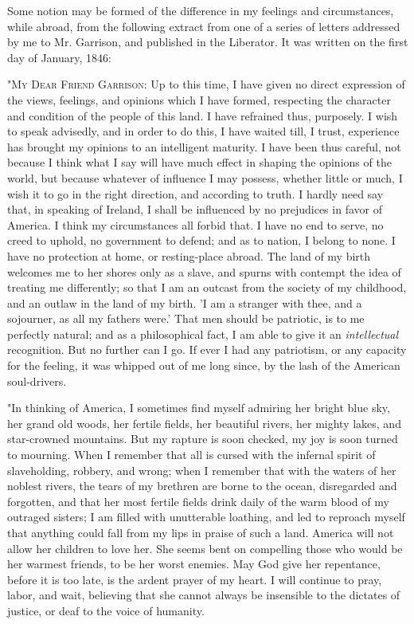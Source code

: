 Some notion may be formed of the difference in my feelings and
circumstances, while abroad, from the following extract from one of a
series of letters addressed by me to Mr. Garrison, and published in the
Liberator. It was written on the first day of January, 1846:

"\textsc{My Dear Friend Garrison}: Up to this time, I have given no
direct expression of the views, feelings, and opinions which I have
formed, respecting the character and condition of the people of this
land. I have refrained thus, purposely. I wish to speak advisedly, and
in order to do this, I have waited till, I trust, experience has brought
my opinions to an intelligent maturity. I have been thus careful, not
because I think what I say will have much effect in shaping the opinions
of the world, but because whatever of influence I may possess, whether
little or much, I wish it to go in the right direction, and according to
truth. I hardly need say that, in speaking of Ireland, I shall be
influenced by no prejudices in favor of America. I think my
circumstances all forbid that. I have no end to serve, no creed to
uphold, no government to defend; and as to nation, I belong to none. I
have no protection at home, or resting-place abroad. The land of my
birth welcomes me to her shores only as a slave, and spurns with
contempt the idea of treating me differently; so that I am an outcast
from the society of my childhood, and an outlaw in the land of my birth.
'I am a stranger with thee, and a sojourner, as all my {}fathers were.'
That men should be patriotic, is to me perfectly natural; and as a
philosophical fact, I am able to give it an \emph{intellectual}
recognition. But no further can I go. If ever I had any patriotism, or
any capacity for the feeling, it was whipped out of me long since, by
the lash of the American soul-drivers.

"In thinking of America, I sometimes find myself admiring her bright
blue sky, her grand old woods, her fertile fields, her beautiful rivers,
her mighty lakes, and star-crowned mountains. But my rapture is soon
checked, my joy is soon turned to mourning. When I remember that all is
cursed with the infernal spirit of slaveholding, robbery, and wrong;
when I remember that with the waters of her noblest rivers, the tears of
my brethren are borne to the ocean, disregarded and forgotten, and that
her most fertile fields drink daily of the warm blood of my outraged
sisters; I am filled with unutterable loathing, and led to reproach
myself that anything could fall from my lips in praise of such a land.
America will not allow her children to love her. She seems bent on
compelling those who would be her warmest friends, to be her worst
enemies. May God give her repentance, before it is too late, is the
ardent prayer of my heart. I will continue to pray, labor, and wait,
believing that she cannot always be insensible to the dictates of
justice, or deaf to the voice of humanity.

